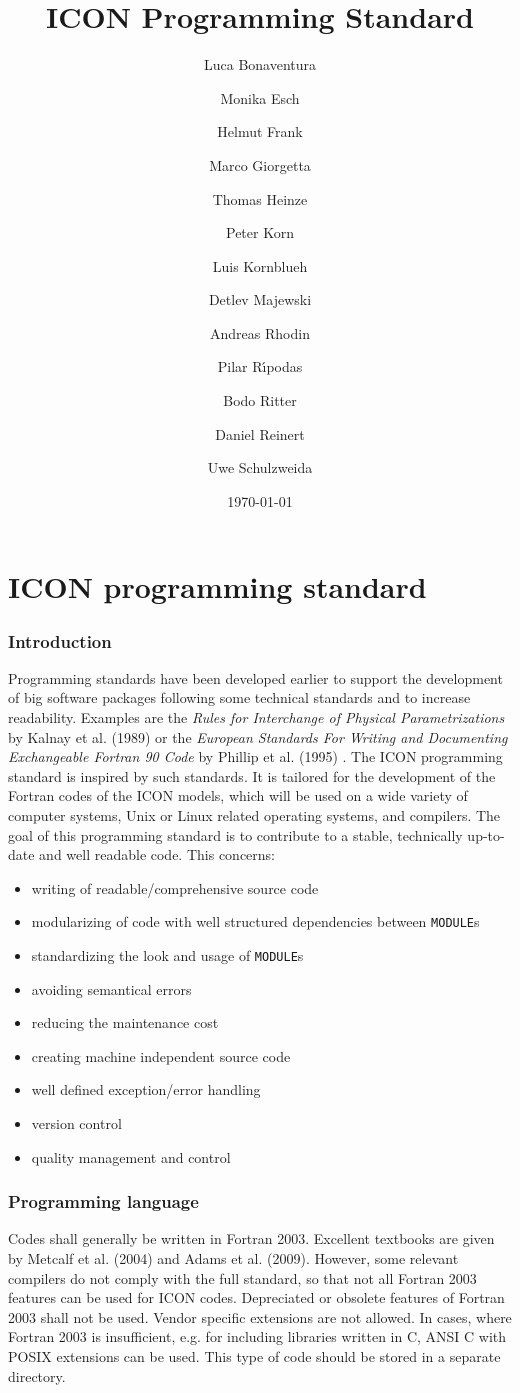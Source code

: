\documentclass[a4paper,11pt,DIV16,BCOR1cm,titlepage]{scrartcl}
\title{\vspace{6cm}ICON Programming Standard}
\author[1]{Luca Bonaventura}
\author[1]{Monika Esch}
\author[2]{Helmut Frank}
\author[1]{Marco Giorgetta}
\author[2]{Thomas Heinze}
\author[1]{Peter Korn}
\author[1]{Luis Kornblueh}
\author[2]{Detlev Majewski}
\author[2]{Andreas Rhodin}
\author[2]{Pilar R\'\i{}podas}
\author[2]{Bodo Ritter}
\author[2]{Daniel Reinert}
\author[1]{Uwe Schulzweida}
\affil[1]{Max-Planck-Institut f\"ur Meteorologie\\Bundesstr. 53\\D-20146 Hamburg\\Germany}
\affil[2]{Deutscher Wetterdienst\\Frankfurter Str. 135\\D-63067 Offenbach\\Germany}
\date{\vspace{8cm}\today}
\begin{document}
  

\maketitle  
  
\tableofcontents  
  
\newpage  
\part{ICON programming standard}

%
\section{Introduction}  
Programming standards have been developed earlier to support the development
of big software packages following some technical standards and to increase readability.  
Examples are the \textit{Rules for Interchange of Physical Parametrizations} 
by Kalnay et al. (1989) or  the \textit{European Standards For  Writing and Documenting 
Exchangeable Fortran 90 Code}  by Phillip et al. (1995) . The ICON programming standard is 
inspired by such standards. It is tailored for the development of the Fortran codes of the ICON 
models, which will be used on a wide variety of computer systems, Unix or Linux related 
operating systems, and compilers.
%
The goal of this programming standard is to contribute to a stable, technically up-to-date 
and well readable code. This concerns:
\begin{itemize}  
\item writing of readable/comprehensive source code   
\item modularizing of code with well structured dependencies between \texttt{MODULE}s  
\item standardizing the look and usage of \texttt{MODULE}s  
\item avoiding semantical errors  
\item reducing the maintenance cost  
\item creating machine independent source code  
\item well defined exception/error handling  
\item version control  
\item quality management and control  
\end{itemize}  

%
\section{Programming language}  
%
Codes shall generally be written in Fortran 2003. Excellent textbooks are given by 
Metcalf et al. (2004) and Adams et al. (2009). However, some relevant compilers do 
not comply with the full standard, so that not all Fortran 2003 features can be used  
for ICON codes. Depreciated or obsolete  features of Fortran 2003 shall not be used. 
Vendor specific extensions are not allowed. 
%
In cases, where Fortran 2003 is insufficient, e.g. for including libraries written in
C, ANSI C with POSIX extensions can be used. This type of code should be stored in 
a separate directory.
\end{document}
